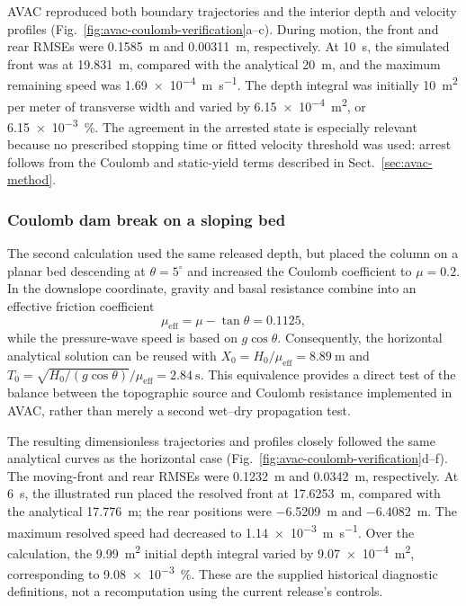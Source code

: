\documentclass[11pt,a4paper]{article}
\begin{document}
AVAC reproduced both boundary trajectories and the interior depth and
velocity profiles (Fig.~\ref{fig:avac-coulomb-verification}a--c).  During
motion, the front and rear RMSEs were \SI{0.1585}{\metre} and
\SI{0.00311}{\metre}, respectively.  At \SI{10}{\second}, the simulated front
was at \SI{19.831}{\metre}, compared with the analytical
\SI{20}{\metre}, and the maximum remaining speed was
\SI{1.69e-4}{\metre\per\second}. The depth integral was initially
\SI{10}{\metre\squared} per meter of transverse width and varied by
\SI{6.15e-4}{\metre\squared}, or \SI{6.15e-3}{\percent}.  The agreement in
the arrested state is especially relevant because no prescribed stopping time
or fitted velocity threshold was used: arrest follows from the Coulomb and
static-yield terms described in Sect.~\ref{sec:avac-method}.

\subsubsection{Coulomb dam break on a sloping bed}

The second calculation used the same released depth, but placed the column on
a planar bed descending at $\theta=5^\circ$ and increased the Coulomb
coefficient to $\mu=0.2$.  In the downslope coordinate, gravity and basal
resistance combine into an effective friction coefficient
\begin{equation}
  \mu_{\mathrm{eff}}=\mu-\tan\theta=0.1125,
  \label{eq:inclined-effective-friction}
\end{equation}
while the pressure-wave speed is based on $g\cos\theta$.  Consequently, the
horizontal analytical solution can be reused with
$X_0=H_0/\mu_{\mathrm{eff}}=\SI{8.89}{\metre}$ and
$T_0=\sqrt{H_0/(g\cos\theta)}/\mu_{\mathrm{eff}}=\SI{2.84}{\second}$.
This equivalence provides a direct test of the balance between the topographic
source and Coulomb resistance implemented in AVAC, rather than merely a second
wet--dry propagation test.

The resulting dimensionless trajectories and profiles closely followed the
same analytical curves as the horizontal case
(Fig.~\ref{fig:avac-coulomb-verification}d--f).  The moving-front and rear
RMSEs were \SI{0.1232}{\metre} and \SI{0.0342}{\metre}, respectively. At
\SI{6}{\second}, the illustrated run placed the resolved front at \SI{17.6253}{\metre},
compared with the analytical \SI{17.776}{\metre}; the rear
positions were \SI{-6.5209}{\metre} and \SI{-6.4082}{\metre}. The maximum
resolved speed had decreased to \SI{1.14e-3}{\metre\per\second}. Over the
calculation, the \SI{9.99}{\metre\squared} initial depth integral varied by
\SI{9.07e-4}{\metre\squared}, corresponding to
\SI{9.08e-3}{\percent}. These are the supplied historical diagnostic
definitions, not a recomputation using the current release's controls.
\end{document}
